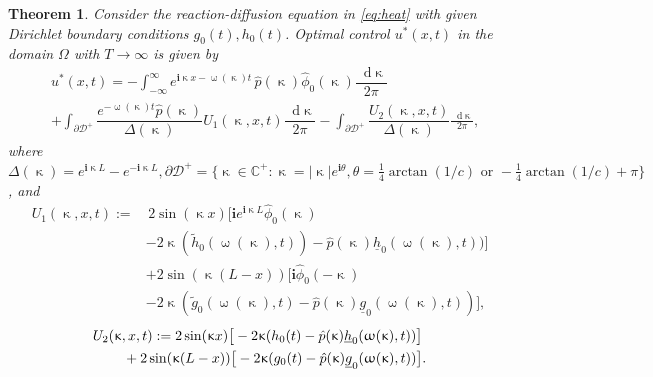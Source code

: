\documentclass[journal,twoside,web]{ieeecolor}
\newtheorem{theorem}{Theorem}
\newcommand{\CC}{\mathbb{C}}
\newcommand{\D}{\mathcal{D}}
\newcommand{\state}{\phi}
\newcommand{\statehat}{\hat{\state}}
\newcommand{\im}{\mathbf{i}}
\newcommand*\diff{\mathop{}\!\mathrm{d}}
\newcommand{\abs}[1]{\left|#1\right|}
\newcommand{\wcomplex}{\upomega}
\newcommand{\kcomplex}{\upkappa}
\begin{document}
\begin{theorem}\label{theo:u-opt-effective-heat}
	Consider the reaction-diffusion equation in \eqref{eq:heat} with given Dirichlet boundary conditions $g_0(t),h_0(t)$. Optimal control $u^*(x,t)$ in the domain $\Omega$ with $T\to\infty$ is given by
	\begin{equation}\label{eq:u-opt-effective}
		\begin{aligned}
			&u^*(x,t) = -\int_{-\infty}^{\infty}e^{\im \kcomplex x-\wcomplex(\kcomplex)t}\, \hat{p}(\kcomplex)\statehat_0(\kcomplex)\dfrac{\diff \kcomplex}{2\pi} \\
			&+ \int_{\partial\D^+}\dfrac{e^{-\wcomplex(\kcomplex)t}\hat{p}(\kcomplex)}{\Delta(\kcomplex)}U_1(\kcomplex,x,t)\dfrac{\diff \kcomplex}{2\pi}- \int_{\partial\D^+}\dfrac{U_2(\kcomplex,x,t)}{\Delta(\kcomplex)} \frac{\diff \kcomplex}{2\pi},
		\end{aligned}
	\end{equation}
	where $\Delta(\kcomplex)=e^{\im \kcomplex L} - e^{-\im \kcomplex L}, \partial \D^+=\{\kcomplex\in\CC^+:\kcomplex=\abs{\kcomplex}e^{\im \theta}, \theta = \frac{1}{4}\arctan(1/c) \text{ or }-\frac{1}{4}\arctan(1/c)+\pi\}$, and
	\begin{equation*}
		\begin{split}		
			U_1(\kcomplex,x,t):=&\, 2\sin(\kcomplex x)\big[\im e^{\im \kcomplex L}\statehat_0(\kcomplex) \\ 
			&- 2\kcomplex(\tilde{h}_0(\wcomplex(\kcomplex),t)) - \hat{p}(\kcomplex)\underline{h}_0(\wcomplex(\kcomplex),t))\big]\\
			&+2\sin(\kcomplex(L-x))\big[\im \statehat_0(-\kcomplex) \\ 
			& -2\kcomplex(\tilde{g}_0(\wcomplex(\kcomplex),t)-\hat{p}(\kcomplex)\underline{g}_0(\wcomplex(\kcomplex),t))\big], 	
		\end{split}
	\end{equation*}
	\begin{equation*}
		\begin{split}
			&U_2(\kcomplex,x,t):=2\sin(\kcomplex x) \big[-2\kcomplex(h_0(t) - \hat{p}(\kcomplex)\underline{h}_0(\wcomplex(\kcomplex),t))\big] \\
			&\hspace{0.3in}+ 2\sin(\kcomplex(L-x))\big[-2\kcomplex(g_0(t) - \hat{p}(\kcomplex)\underline{g}_0(\wcomplex(\kcomplex),t))\big].
		\end{split}
	\end{equation*}
\end{theorem}
\end{document}
